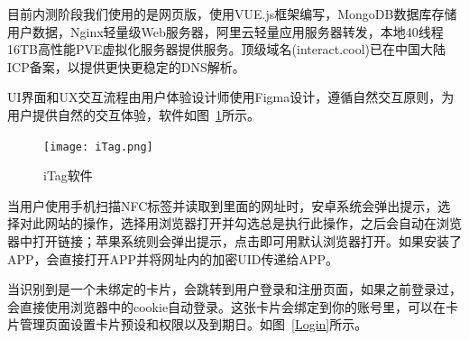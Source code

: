 \documentclass[UTF8]{ctexart}
\begin{document}
目前内测阶段我们使用的是网页版，使用VUE.js框架编写，MongoDB数据库存储用户数据，Nginx轻量级Web服务器，阿里云轻量应用服务器转发，本地40线程16TB高性能PVE虚拟化服务器提供服务。顶级域名(interact.cool)已在中国大陆ICP备案，以提供更快更稳定的DNS解析。

UI界面和UX交互流程由用户体验设计师使用Figma设计，遵循自然交互原则，为用户提供自然的交互体验，软件如图~\ref{iTagAPP}所示。

\begin{figure}[htbp]
    \centering
    \texttt{[image: iTag.png]}
    \caption{iTag软件} 
    \label{iTagAPP}
\end{figure}

当用户使用手机扫描NFC标签并读取到里面的网址时，安卓系统会弹出提示，选择对此网站的操作，选择用浏览器打开并勾选总是执行此操作，之后会自动在浏览器中打开链接；苹果系统则会弹出提示，点击即可用默认浏览器打开。如果安装了APP，会直接打开APP并将网址内的加密UID传递给APP。

当识别到是一个未绑定的卡片，会跳转到用户登录和注册页面，如果之前登录过，会直接使用浏览器中的cookie自动登录。这张卡片会绑定到你的账号里，可以在卡片管理页面设置卡片预设和权限以及到期日。如图~\ref{Login}所示。
\end{document}
